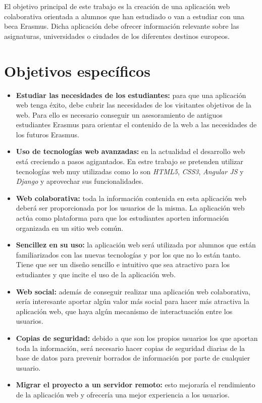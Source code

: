 \documentclass[a4paper, 12pt]{book}
\begin{document}
El objetivo principal de este trabajo es la creación de una aplicación web colaborativa orientada a alumnos que han estudiado o van a estudiar con una beca Erasmus. Dicha aplicación debe ofrecer información relevante sobre las asignaturas, universidades o ciudades de los diferentes destinos europeos.

\section{Objetivos específicos}
\label{sec:objetivos-especificos}

\begin{itemize}
        \item \textbf{Estudiar las necesidades de los estudiantes:} para que una aplicación web tenga éxito, debe cubrir las necesidades de los visitantes objetivos de la web. Para ello es necesario conseguir un asesoramiento de antiguos estudiantes Erasmus  para orientar el contenido de la web a las necesidades de los futuros Erasmus.
        \item \textbf{Uso de tecnologías web avanzadas:} en la actualidad el desarrollo web está creciendo a pasos agigantados. En estre trabajo se pretenden utilizar tecnologías web muy utilizadas como lo son \textit{HTML5}, \textit{CSS3}, \textit{Angular JS} y \textit{Django} y aprovechar sus funcionalidades.
        \item \textbf{Web colaborativa:} toda la información contenida en esta aplicación web deberá ser proporcionada por los usuarios de la misma. La aplicación web actúa como plataforma para que los estudiantes aporten información organizada en un sitio web común.
        \item \textbf{Sencillez en su uso:} la aplicación web será utilizada por alumnos que están familiarizados con las nuevas tecnologías y por los que no lo están tanto. Tiene que ser un diseño sencillo e intuitivo que sea atractivo para los estudiantes y que incite el uso de la aplicación web.
        \item \textbf{Web social:} además de conseguir realizar una aplicación web colaborativa, sería interesante aportar algún valor más social para hacer más atractiva la aplicación web, que haya algún mecanismo de interactuación entre los usuarios.
        \item \textbf{Copias de seguridad:} debido a que son los propios usuarios los que aportan toda la información, será necesario hacer copias de seguridad diarias de la base de datos para prevenir borrados de información por parte de cualquier usuario.
        \item \textbf{Migrar el proyecto a un servidor remoto:} esto mejoraría el rendimiento de la aplicación web y ofrecería una mejor experiencia a los usuarios.
\end{itemize}
\end{document}
